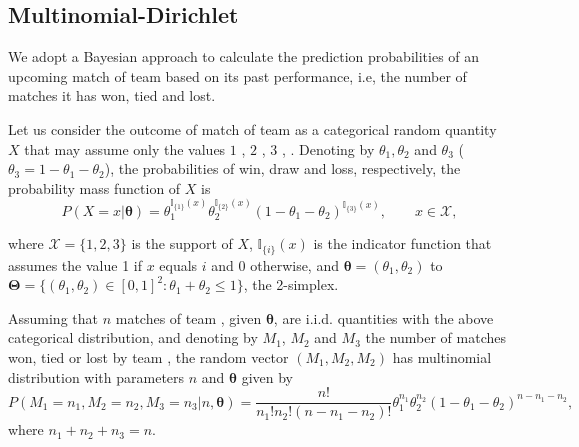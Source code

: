 \documentclass[journal,article,accept,moreauthors,pdftex,12pt,a4paper]{mdpi}
\begin{document}
	\subsection{Multinomial-Dirichlet}
	\label{sec::Mn_Dir}
	
	We adopt a Bayesian approach to calculate the prediction probabilities of an upcoming match of  team   based on its past performance, i.e, the number of matches it has won, tied and lost.
	
	Let us consider the outcome of  match of team  as a categorical random quantity $X$ that may assume only the values $1$ , $2$ , $3$ , .
	Denoting by $\theta_1, \theta_2$ and $\theta_3$ ($\theta_3 = 1-\theta_1 - \theta_2$), the probabilities of win, draw and loss, respectively, the probability mass function of $X$ is
	\[
	P(X=x | \boldsymbol{\theta}) = \theta_1^{\mathbb{I}_{\{1\}}(x)}
	\theta_2^{\mathbb{I}_{\{2\}}(x)}(1 - \theta_1 -
	\theta_2)^{{\mathbb{I}_{\{3\}}}(x)}, \qquad x \in \mathcal{X},
	\]
	
	\noindent
	where $\mathcal{X}=\{1,2,3\}$ is the support of $X$,
	$\mathbb{I}_{\{i\}}(x)$ is the indicator function that assumes the
	value 1 if $x$ equals $i$ and 0 otherwise, and $\boldsymbol{\theta}
	= (\theta_1, \theta_2)$  to $\boldsymbol{\Theta} =
	\{(\theta_1,\theta_2)\in [0,1]^2: \theta_1+\theta_2 \leq 1 \}$, the 2-simplex.
	
	Assuming that  $n$ matches of team , given $\boldsymbol{\theta}$, are i.i.d. quantities with the above categorical distribution, and denoting by $M_1$, $M_2$ and $M_3$ the number of matches won, tied or lost by team , the random vector $(M_1, M_2, M_2)$ has multinomial distribution with parameters $n$ and $\boldsymbol{\theta}$ given by
	\[
	P(M_1=n_1,M_2=n_2,M_3=n_3| n, \boldsymbol{\theta})=
	\frac{n!}{n_1!n_2!(n-n_1-n_2)!}\theta_1^{n_1}\theta_2^{n_2}(1-\theta_1-\theta_2)^{n-n_1-n_2},
	\]
	\noindent 
	where $n_1 + n_2 + n_3 = n$.
	
\end{document}
